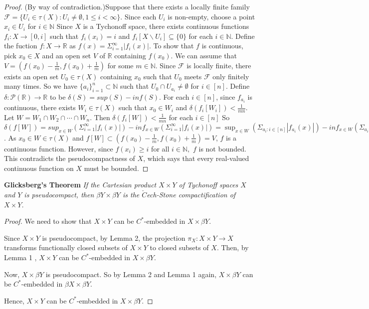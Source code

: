 \documentclass{amsart}
\begin{document}
\begin{proof}
(By way of contradiction.)Suppose that there exists a locally finite family $\mathcal{F}=\{U_i \in \tau(X): U_i\neq \emptyset, 1\leq i < \infty\}$. Since each $U_i$ is non-empty, choose a point $x_i\in U_i$ for $i\in \mathbb{N}$ Since 
$X$ is a Tychonoff space, there exists continuous functions $f_i:X \rightarrow [0,i]$ such that $f_i(x_i)=i$ and 
$f_i[X \backslash U_i] \subseteq \{0\}$ for each $i \in \mathbb{N}$. Define the fuction $f:X\rightarrow \mathbb{R}$ as $f(x)=\Sigma_{i=1}^\infty |f_i(x)|$. To show that $f$ is continuous, pick $x_0\in X$ and an open set $V$ of $\mathbb{R}$ containing $f(x_0)$. 
We can assume that  $V=(f(x_0)-\frac{1}{m}, f(x_0)+\frac{1}{m})$ for some $m \in \mathbb{N}$.
Since $\mathcal{F}$ is locally finite, there exists an open set $U_0 \in \tau(X)$ containing $x_0$ such that $U_0$ meets $\mathcal{F}$ only finitely many times. 
So we have $\{a_i\}_{i=1}^{n} \subset \mathbb{N}$ such that $U_0\cap U_{a_i} \neq \emptyset$ for $i\in [n].$
Define $\delta: \mathcal{P}(\mathbb{R}) \rightarrow \mathbb{R}$ to be $\delta(S)=sup (S) - inf (S).$
For each $i \in [n]$, since  $f_{a_i}$ is continuous, there exists $W_i \in \tau(X)$ 
such that $x_0\in W_i$ and  $\delta(f_i[W_i])<\frac{1}{mn}$. 
Let $W=W_1 \cap W_2 \cap \cdots \cap W_n$. 
Then $\delta(f_i[W])< \frac{1}{mn}$ for each $i\in [n]$ 
So $\delta(f[W])=sup_{x\in W}(\Sigma_{i=1}^\infty |f_i(x)|)-inf_{x\in W}(\Sigma_{i=1}^\infty |f_i(x)|) 
=\sup_{x\in W}(\Sigma_{a_i: i\in [n]} |f_{a_i}(x)|)-inf_{x\in W}(\Sigma_{a_i: i\in [n]}|f_{a_i}(x)|)
=\Sigma_{a_i: i\in [n]}(\sup_{x\in W}( |f_{a_i}(x)|)-inf_{x\in W}|f_{a_i}(x)|)<n\frac{1}{mn}=\frac{1}{m}$. 
As $x_0\in W\in \tau(X)$ and $f[W]\subset (f(x_0)-\frac{1}{m}, f(x_0)+\frac{1}{m})=V$, $f$ is a continuous function. 
However, since $f(x_i) \geq i$ for all $i\in \mathbb{N},$ $f$ is  not bounded. This contradicts the pseudocompactness of $X$, which says that every real-valued continuous function on $X$ must be bounded.



\end{proof}

\textbf{Glicksberg's Theorem}
\emph{If the Cartesian product $X\times Y$ of Tychonoff spaces $X$ and $Y$ is pseudocompact, then $\beta Y \times \beta Y $ is the $\check{C}$ech-Stone compactification of $X\times Y$.}
\begin{proof}
We need to show that $X\times Y$ can be $C^*$-embedded  in $X\times \beta Y$. 

Since $X\times Y$ is pseudocompact, by Lemma 2, the projection $\pi_X: X\times Y \rightarrow X$ transforms functionally closed subsets of $X\times Y$ to closed subsets of $X$. Then, by Lemma 1 , $X\times Y$ can be $C^*$-embedded in $X\times \beta Y$. 


Now, $X\times \beta Y$ is pseudocompact. So by Lemma 2 and Lemma 1 again, $X\times \beta Y$ can be $C^*$-embedded in $\beta X\times \beta Y$.  

Hence, $X \times Y$ can be $C^*$-embedded  in $X\times \beta Y$.




\end{proof}
\end{document}
